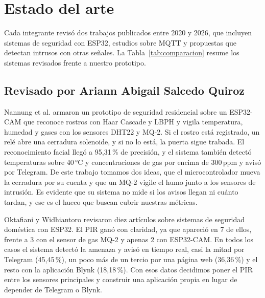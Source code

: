 \documentclass[manuscript,screen,nonacm]{acmart}
\begin{document}
\section{Estado del arte}
\label{sec:estado-arte}

Cada integrante revisó dos trabajos publicados entre 2020 y 2026, que incluyen sistemas de seguridad con ESP32, estudios sobre MQTT y propuestas que detectan intrusos con otras señales. La Tabla~\ref{tab:comparacion} resume los sistemas revisados frente a nuestro prototipo.

\subsection{Revisado por Ariann Abigail Salcedo Quiroz}
Nannung et al. \cite{nannung2025iot} armaron un prototipo de seguridad residencial sobre un ESP32-CAM que reconoce rostros con Haar Cascade y LBPH y vigila temperatura, humedad y gases con los sensores DHT22 y MQ-2. Si el rostro está registrado, un relé abre una cerradura solenoide, y si no lo está, la puerta sigue trabada. El reconocimiento facial llegó a 95,31\,\% de precisión, y el sistema también detectó temperaturas sobre 40\,°C y concentraciones de gas por encima de 300\,ppm y avisó por Telegram. De este trabajo tomamos dos ideas, que el microcontrolador mueva la cerradura por su cuenta y que un MQ-2 vigile el humo junto a los sensores de intrusión. Es evidente que su sistema no mide si los avisos llegan ni cuánto tardan, y ese es el hueco que buscan cubrir nuestras métricas.

Oktafiani y Widhiantoro \cite{oktafiani2025esp32} revisaron diez artículos sobre sistemas de seguridad doméstica con ESP32. El PIR ganó con claridad, ya que apareció en 7 de ellos, frente a 3 con el sensor de gas MQ-2 y apenas 2 con ESP32-CAM. En todos los casos el sistema detectó la amenaza y avisó en tiempo real, casi la mitad por Telegram (45,45\,\%), un poco más de un tercio por una página web (36,36\,\%) y el resto con la aplicación Blynk (18,18\,\%). Con esos datos decidimos poner el PIR entre los sensores principales y construir una aplicación propia en lugar de depender de Telegram o Blynk.
\end{document}
